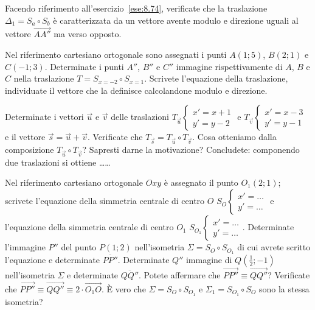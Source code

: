 \begin{esercizio}
\label{ese:8.75} %
Facendo riferimento all'esercizio~\ref{ese:8.74}, verificate che la traslazione $\Delta_1 = S_a \circ S_b$ è caratterizzata da un vettore avente modulo e direzione uguali al vettore $\overrightarrow{AA''}$ ma verso opposto.
\end{esercizio}

\begin{esercizio}
\label{ese:8.76} %
Nel riferimento cartesiano ortogonale sono assegnati i punti $A(1;5)$, $B(2;1)$ e $C(-1;3)$. Determinate i punti $A''$, $B''$ e $C''$ immagine rispettivamente di $A$, $B$ e $C$ nella traslazione $T=S_{x=-2} \circ S_{x=1}$. Scrivete l'equazione della traslazione, individuate il vettore che la definisce calcolandone modulo e direzione.
\end{esercizio}

\begin{esercizio}
\label{ese:8.77} %
Determinate i vettori $\vec{u}$ e $\vec{v}$ delle traslazioni $T_{\vec{u}}\begin{cases}x'=x+1\\y'=y-2\end{cases}$ e $T_{\vec{v}}\begin{cases}x'=x-3\\y'=y-1\end{cases}$ e il vettore $\vec{s} = \vec{u} + \vec{v}$. Verificate che $T_{\vec{s}} = T_{\vec{u}} \circ T_{\vec{v}}$.
Cosa otteniamo dalla composizione $T_{\vec{u}} \circ T_{\vec{v}}$? Sapresti darne la motivazione?
Concludete: componendo due traslazioni si ottiene \ldots\ldots{}
\end{esercizio}

\begin{esercizio}
\label{ese:8.78} %
Nel riferimento cartesiano ortogonale $Oxy$ è assegnato il punto $O_1(2;1)$; scrivete l'equazione della simmetria centrale di centro $O$ $S_O\begin{cases}x'=\ldots{}\\y'=\ldots{}\end{cases}$  e l'equazione della simmetria centrale di centro $O_1$ $S_{O_1}\begin{cases}x'=\ldots{}\\y'=\ldots{}\end{cases}$. Determinate l'immagine $P''$ del punto $P(1;2)$ nell'isometria $\Sigma=S_O \circ S_{O_1}$ di cui avrete scritto l'equazione e determinate $\overline{PP''}$. Determinate $Q''$ immagine di $Q\left(\frac{1}{2};-1\right)$ nell'isometria $\Sigma$ e determinate $\overline{QQ''}$. Potete affermare che $\overrightarrow{PP''} \equiv \overrightarrow{QQ''}$? Verificate che $\overrightarrow{PP''} \equiv \overrightarrow{QQ''} \equiv 2\cdot \overrightarrow{O_1O}$.
\`E vero che $\Sigma=S_O \circ S_{O_1}$ e $\Sigma_1=S_{O_1} \circ S_{O}$ sono la stessa isometria?
\end{esercizio}

